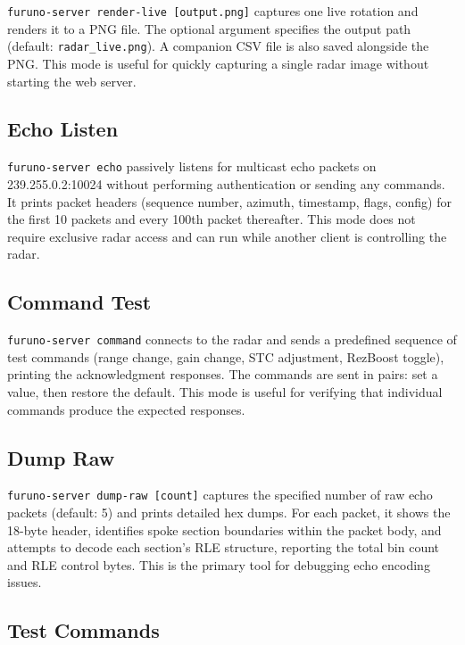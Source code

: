 \documentclass[11pt,letterpaper]{article}
\begin{document}
\texttt{furuno-server render-live [output.png]} captures one live rotation and renders it to a PNG file. The optional argument specifies the output path (default: \texttt{radar\_live.png}). A companion CSV file is also saved alongside the PNG. This mode is useful for quickly capturing a single radar image without starting the web server.

\subsection{Echo Listen}
\label{subsec:cli-echo}

\texttt{furuno-server echo} passively listens for multicast echo packets on 239.255.0.2:10024 without performing authentication or sending any commands. It prints packet headers (sequence number, azimuth, timestamp, flags, config) for the first 10 packets and every 100th packet thereafter. This mode does not require exclusive radar access and can run while another client is controlling the radar.

\subsection{Command Test}
\label{subsec:cli-command}

\texttt{furuno-server command} connects to the radar and sends a predefined sequence of test commands (range change, gain change, STC adjustment, RezBoost toggle), printing the acknowledgment responses. The commands are sent in pairs: set a value, then restore the default. This mode is useful for verifying that individual commands produce the expected responses.

\subsection{Dump Raw}
\label{subsec:cli-dump-raw}

\texttt{furuno-server dump-raw [count]} captures the specified number of raw echo packets (default: 5) and prints detailed hex dumps. For each packet, it shows the 18-byte header, identifies spoke section boundaries within the packet body, and attempts to decode each section's RLE structure, reporting the total bin count and RLE control bytes. This is the primary tool for debugging echo encoding issues.

\subsection{Test Commands}
\label{subsec:cli-test-commands}
\end{document}
